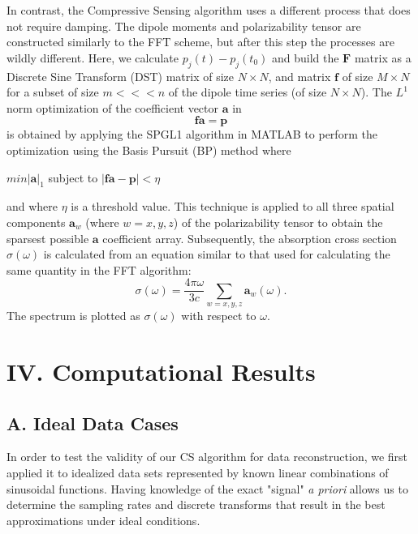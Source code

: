\documentclass[11pt]{article}
\begin{document}
In contrast, the Compressive Sensing algorithm uses a different process that does not require damping.  The dipole moments and polarizability tensor are constructed similarly to the FFT scheme, but after this step the processes are wildly different. Here, we calculate $p_{j}(t) - p_{j}(t_{0})$ and build the $\mathbf{F}$ matrix as a Discrete Sine Transform (DST) matrix of size $N \times N$, and matrix $\mathbf{f}$ of size $M \times N$  for a subset of size $m <<< n$ of the dipole time series (of size $N \times N$).  The $L^{1}$ norm optimization of the coefficient vector $\mathbf{a}$ in 
$$\mathbf{f}\mathbf{a} = \mathbf{p}$$
is obtained by applying the SPGL1 algorithm in MATLAB to perform the optimization using the Basis Pursuit (BP) method where\\
\begin{center}
$min |\mathbf{a}|_{1}$ subject to $|\mathbf{f}\mathbf{a} - \mathbf{p}| < \eta$\\
\end{center}
and where $\eta$ is a threshold value. This technique is applied to all three spatial components $\mathbf{a}_{w}$ (where $w = x,y,z$) of the polarizability tensor to obtain the sparsest possible $\mathbf{a}$ coefficient array.  Subsequently, the absorption cross section $\sigma(\omega)$ is calculated from an equation similar to that used for calculating the same quantity in the FFT algorithm:
$$\sigma(\omega) = \frac{4\pi\omega}{3c}\sum_{w = x,y,z}\mathbf{a}_{w}(\omega).$$
The spectrum is plotted as $\sigma(\omega)$ with respect to $\omega$.


\section*{IV.	Computational Results} %


\subsection*{A.	Ideal Data Cases}
In order to test the validity of our CS algorithm for data reconstruction, we first applied it to idealized data sets represented by known linear combinations of sinusoidal functions. Having knowledge of the exact "signal" \emph{a priori} allows us to determine the sampling rates and discrete transforms that result in the best approximations under ideal conditions. 
\end{document}
